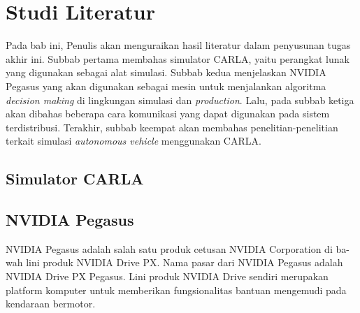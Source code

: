 \chapter{Studi Literatur}

Pada bab ini, Penulis akan menguraikan hasil literatur dalam penyusunan tugas
akhir ini. Subbab pertama membahas simulator CARLA, yaitu perangkat lunak yang
digunakan sebagai alat simulasi. Subbab kedua menjelaskan NVIDIA Pegasus yang
akan digunakan sebagai mesin untuk menjalankan algoritma \textit{decision
      making} di lingkungan simulasi dan \textit{production}. Lalu, pada subbab
ketiga akan dibahas beberapa cara komunikasi yang dapat digunakan pada sistem
terdistribusi. Terakhir, subbab keempat akan membahas penelitian-penelitian
terkait simulasi \textit{autonomous vehicle} menggunakan CARLA.

\section{Simulator CARLA}
\blindtext


\section{NVIDIA Pegasus}

NVIDIA Pegasus adalah salah satu produk cetusan NVIDIA Corporation di ba-wah
lini produk NVIDIA Drive PX. Nama pasar dari NVIDIA Pegasus adalah NVIDIA Drive
PX Pegasus. Lini produk NVIDIA Drive sendiri merupakan platform komputer untuk
memberikan fungsionalitas bantuan mengemudi pada kendaraan bermotor.

